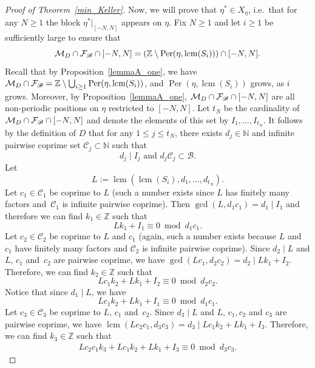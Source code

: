 \documentclass[leqno,a4paper,12pt]{article}
\DeclareMathOperator{\lcm}{lcm}
\theoremstyle{definition}
\newcommand{\divides}{\mid}
\newcommand{\Per}{\operatorname{Per}\nolimits}
\newcommand{\cf}{{\cal F}}
\newcommand{\cm}{{\cal M}}
\newcommand{\Z}{{\mathbb{Z}}}
\newcommand{\N}{{\mathbb{N}}}
\newcommand{\sB}{\mathscr{B}}
\begin{document}
\begin{proof}[Proof of Theorem~\ref{min_Keller}]
Now, we will prove that $\eta^*\in X_\eta$, i.e.\ that for any $N\geq 1$ the block $\eta^*|_{[-N,N]}$ appears on $\eta$. Fix $N\geq 1$ and let $i\geq1$ be sufficiently large to ensure that
\begin{equation}\label{righti_one}
 \cm_D\cap\cf_\sB\cap [-N,N]=(\Z\setminus\Per(\eta,\lcm(S_i)))\cap [-N,N].
\end{equation}
Recall that by Proposition~\ref{lemmaA_one}, we have $\cm_D\cap\cf_\sB=\Z\setminus\bigcup_{i\geq 1}\Per(\eta,\lcm(S_i))$,
and $\Per(\eta,\lcm(S_i))$ grows, as $i$ grows. Moreover, by Proposition~\ref{lemmaA_one}, $\cm_D\cap\cf_\sB\cap [-N,N]$ are all non-periodic positions on $\eta$ restricted to $[-N,N]$. Let $t_N$ be the cardinality of $\cm_D\cap\cf_\sB\cap [-N,N]$ and denote the elements of this set by $I_1,\dots, I_{t_N}$. It follows by the definition of $D$ that for any $1\leq j\leq t_N$, there exists $d_j\in \N$ and infinite pairwise coprime set $\mathcal{C}_j\subset \N$ such that
\[
d_j\divides I_j \text{ and }d_j\mathcal{C}_j\subset \sB.
\]
Let
%
\[
L:=\lcm(\lcm(S_i),d_1,\ldots,d_{t_N}).
\]
Let $c_1\in\mathcal{C}_1$ be coprime to $L$ (such a number exists since $L$ has finitely many factors and~$\mathcal{C}_1$ is infinite pairwise coprime). Then $\gcd(L,d_1c_1)=d_1\divides I_1$ and therefore we can find $k_1\in \Z$ such that
\[
Lk_1+I_1\equiv 0 \bmod d_1c_1.
\]
Let $c_2\in\mathcal{C}_2$ be coprime to $L$ and $c_1$ (again, such a number exists because $L$ and~$c_1$ have finitely many factors and $\mathcal{C}_2$ is infinite pairwise coprime). Since $d_2\mid L$ and $L$, $c_1$ and~$c_2$ are pairwise coprime, we have $\gcd(Lc_1,d_2c_2)=d_2\divides Lk_1+I_2$. Therefore, we can find $k_2\in\Z$ such that
\[
Lc_1k_2+Lk_1+I_2\equiv 0 \bmod d_2c_2.
\]
Notice that since $d_1\mid L$, we have
\[
Lc_1k_2+Lk_1+I_1\equiv 0\bmod d_1c_1.
\]
Let $c_3\in\mathcal{C}_3$ be coprime to $L$, $c_1$ and~$c_2$. Since $d_3\divides L$ and $L$, $c_1,c_2$ and $c_3$ are pairwise coprime, we have $\lcm(Lc_2c_1,d_3c_3)=d_3 \divides Lc_1k_2+Lk_1+I_3$. Therefore, we can find $k_3\in\Z$ such that
\begin{align*}
Lc_2c_1k_3+Lc_1k_2+Lk_1+I_3\equiv 0 \bmod d_3c_3.
\end{align*}

\end{proof}
\end{document}
